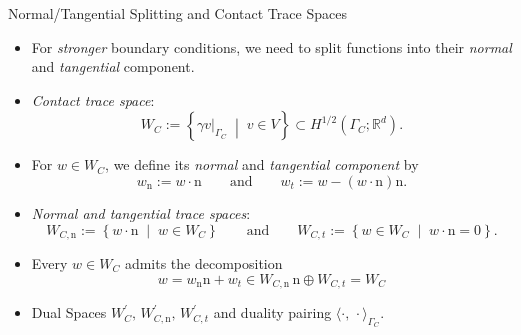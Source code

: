 \documentclass[10pt,aspectratio=169]{beamer}
\def\R{{\mathbb R}}
\begin{document}
\begin{frame}{Normal/Tangential Splitting and Contact Trace Spaces}
	\begin{itemize}
		\item For {\em stronger} boundary conditions, we need to split functions into their {\em normal} and {\em tangential} component.
		\item {\em Contact trace space}:
		      \begin{equation*}
			      W_C := \left\{\gamma v|_{\Gamma_C}\; \middle|\; v\in V\right\}\subset H^{1/2}(\Gamma_C;\R^d).
		      \end{equation*}
		\item For $w\in W_C$, we define its {\em normal} and {\em tangential component} by
		      \begin{equation*}
			      w_\mathrm{n} := w\cdot \mathrm n
			      \qquad\text{and}\qquad
			      w_t := w - (w\cdot \mathrm n)\mathrm n.
		      \end{equation*}
		\item {\em Normal and tangential trace spaces}:
		      \begin{equation*}
			      W_{C,\mathrm{n}} := \left\{w\cdot \mathrm n\; \middle|\; w\in W_C\right\}
			      \qquad\text{and}\qquad
			      W_{C,t} := \left\{w\in W_C\; \middle|\; w\cdot \mathrm n = 0\right\}.
		      \end{equation*}
		\item Every $w\in W_C$ admits the decomposition
		      \begin{equation*}
			      w = w_\mathrm{n}\mathrm n + w_t\in W_{C,\mathrm{n}}\,\mathrm{n}\oplus W_{C,t} = W_C
		      \end{equation*}
		\item Dual Spaces $W^\prime_C,\, W_{C,\mathrm{n}}^\prime,\,W_{C,t}^\prime$ and duality pairing $\langle\cdot,\,\cdot\rangle_{\Gamma_C}$.
	\end{itemize}
\end{frame}
\end{document}
